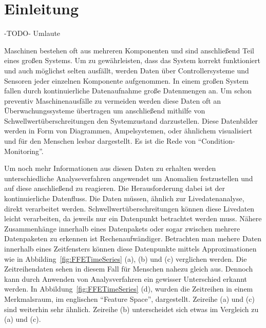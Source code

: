 \section{Einleitung}

\begin{center}
  -TODO- Umlaute
\end{center}


Maschinen bestehen oft aus mehreren Komponenten und sind anschließend Teil eines großen Systems.
Um zu gewährleisten, dass das System korrekt funktioniert und auch möglichst selten ausfällt, werden Daten über Controllersysteme und Sensoren jeder einzelnen Komponente aufgenommen.
In einem großen System fallen durch kontinuierliche Datenaufnahme große Datenmengen an.
Um schon preventiv Maschinenausfälle zu vermeiden werden diese Daten oft an Überwachungssysteme übertragen um anschließend mithilfe von Schwellwertüberschreitungen den Systemzustand darzustellen.
Diese Datenbilder werden in Form von Diagrammen, Ampelsystemen, oder ähnlichem visualisiert und für den Menschen lesbar dargestellt.
Es ist die Rede von \enquote{Condition-Monitoring}.

Um noch mehr Informationen aus diesen Daten zu erhalten werden unterschiedliche Analyseverfahren angewendet um Anomalien festzustellen und auf diese anschließend zu reagieren.
Die Herausforderung dabei ist der kontinuierliche Datenfluss.
Die Daten müssen, ähnlich zur Livedatenanalyse, direkt verarbeitet werden.
Schwellwertüberschreitungen können diese Livedaten leicht verarbeiten, da jeweils nur ein Datenpunkt betrachtet werden muss.
Nähere Zusammenhänge innerhalb eines Datenpakets oder sogar zwischen mehrere Datenpaketen zu erkennen ist Rechenaufwändiger.
Betrachten man mehere Daten innerhalb eines Zeitfensters können diese Datenpunkte mittels Approximationen wie in Abbilding\ \ref{fig:FFETimeSeries} (a), (b) und (c) verglichen werden. 
Die Zeitreihendaten sehen in diesem Fall für Menschen nahezu gleich aus. 
Dennoch kann durch Anwenden von Analysverfahren ein gewisser Unterschied erkannt werden.
In Abbildung\ \ref{fig:FFETimeSeries} (d), wurden die Zeitreihen in einem Merkmalsraum, im englischen \enquote{Feature Space}, dargestellt. 
Zeireihe (a) und (c) sind weiterhin sehr ähnlich.
Zeireihe (b) unterscheidet sich etwas im Vergleich zu (a) und (c).

